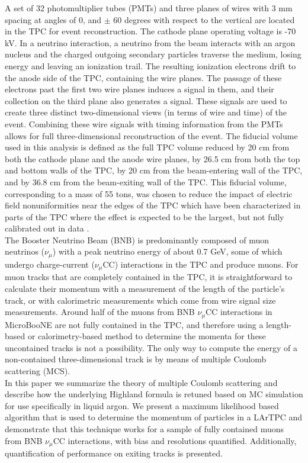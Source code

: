 \documentclass[a4paper,11pt]{article}
\begin{document}
A set of 32 photomultiplier tubes (PMTs) and three planes of wires with 3 mm spacing at angles of 0, and $\pm$ 60 degrees with respect to the vertical are located in the TPC for event reconstruction. The cathode plane operating voltage is -70 kV. In a neutrino interaction, a neutrino from the beam interacts with an argon nucleus and the charged outgoing secondary particles traverse the medium, losing energy and leaving an ionization trail. The resulting ionization electrons drift to the anode side of the TPC, containing the wire planes. The passage of these electrons past the first two wire planes induces a signal in them, and their collection on the third plane also generates a signal. These signals are used to create three distinct two-dimensional views (in terms of wire and time) of the event. Combining these wire signals with timing information from the PMTs allows for full three-dimensional reconstruction of the event. The fiducial volume used in this analysis is defined as the full TPC volume reduced by 20 cm from both the cathode plane and the anode wire planes, by 26.5 cm from both the top and bottom walls of the TPC, by 20 cm from the beam-entering wall of the TPC, and by 36.8 cm from the beam-exiting wall of the TPC. This fiducial volume, corresponding to a mass of 55 tons, was chosen to reduce the impact of electric field nonuniformities near the edges of the TPC which have been characterized in parts of the TPC where the effect is expected to be the largest, but not fully calibrated out in data \cite{SCE_publicnote}.\\

The Booster Neutrino Beam (BNB) is predominantly composed of muon neutrinos ($\nu_\mu$) with a peak neutrino energy of about 0.7 GeV, some of which undergo charge-current ($\nu_\mu$CC) interactions in the TPC and produce muons. For muon tracks that are completely contained in the TPC, it is straightforward to calculate their momentum with a measurement of the length of the particle's track, or with calorimetric measurements which come from wire signal size measurements. Around half of the muons from BNB $\nu_\mu$CC interactions in MicroBooNE are not fully contained in the TPC, and therefore using a length-based or calorimetry-based method to determine the momenta for these uncontained tracks is not a possibility. The only way to compute the energy of a non-contained three-dimensional track is by means of multiple Coulomb scattering (MCS). \\

In this paper we summarize the theory of multiple Coulomb scattering and describe how the underlying Highland formula is retuned based on MC simulation for use specifically in liquid argon. We present a maximum likelihood based algorithm that is used to determine the momentum of particles in a LArTPC and demonstrate that this technique works for a sample of fully contained muons from BNB $\nu_\mu$CC interactions, with bias and resolutions quantified. Additionally, quantification of performance on exiting tracks is presented.
\end{document}
